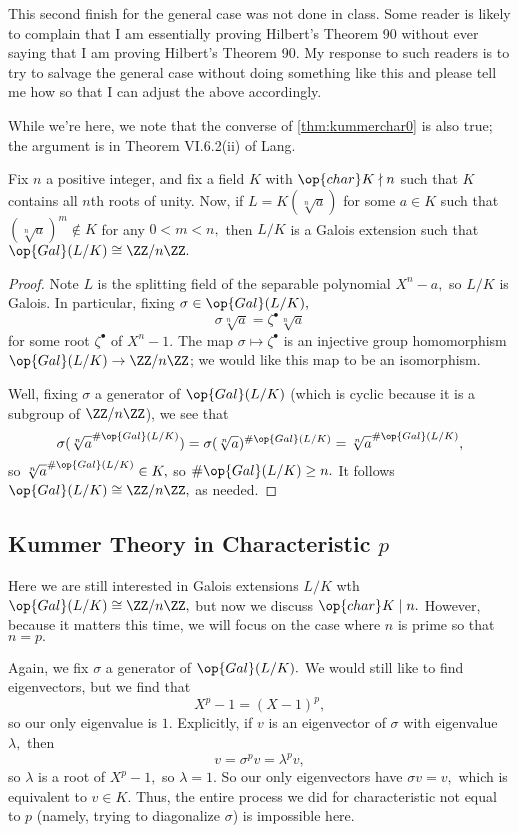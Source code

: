 \begin{remark}[Nir]
	This second finish for the general case was not done in class. Some reader is likely to complain that I am essentially proving Hilbert's Theorem 90 without ever saying that I am proving Hilbert's Theorem 90. My response to such readers is to try to salvage the general case without doing something like this and please tell me how so that I can adjust the above accordingly.
\end{remark}
While we're here, we note that the converse of \autoref{thm:kummerchar0} is also true; the argument is in Theorem VI.6.2(ii) of Lang.
\begin{proposition}
	Fix $n$ a positive integer, and fix a field $K$ with $\op{char}K\nmid n$ such that $K$ contains all $n$th roots of unity. Now, if $L=K(\sqrt[n]a)$ for some $a\in K$ such that $(\sqrt[n]a)^m\notin K$ for any $0<m<n,$ then $L/K$ is a Galois extension such that $\op{Gal}(L/K)\cong\ZZ/n\ZZ.$
\end{proposition}
\begin{proof}
	Note $L$ is the splitting field of the separable polynomial $X^n-a,$ so $L/K$ is Galois. In particular, fixing $\sigma\in\op{Gal}(L/K),$
	\[\sigma\sqrt[n]a=\zeta^\bullet\sqrt[n]a\]
	for some root $\zeta^\bullet$ of $X^n-1.$ The map $\sigma\mapsto\zeta^\bullet$ is an injective group homomorphism $\op{Gal}(L/K)\to\ZZ/n\ZZ$; we would like this map to be an isomorphism.
	
	Well, fixing $\sigma$ a generator of $\op{Gal}(L/K)$ (which is cyclic because it is a subgroup of $\ZZ/n\ZZ$), we see that
	\[\sigma(\sqrt[n]a^{\#\op{Gal}(L/K)})=\sigma(\sqrt[n]a)^{\#\op{Gal}(L/K)}=\sqrt[n]a^{\#\op{Gal}(L/K)},\]
	so $\sqrt[n]a^{\#\op{Gal}(L/K)}\in K,$ so $\#\op{Gal}(L/K)\ge n.$ It follows $\op{Gal}(L/K)\cong\ZZ/n\ZZ,$ as needed.
\end{proof}

\subsection{Kummer Theory in Characteristic \texorpdfstring{$p$}{p}}
Here we are still interested in Galois extensions $L/K$ wth $\op{Gal}(L/K)\cong\ZZ/n\ZZ,$ but now we discuss $\op{char}K\mid n.$ However, because it matters this time, we will focus on the case where $n$ is prime so that $n=p.$

Again, we fix $\sigma$ a generator of $\op{Gal}(L/K).$ We would still like to find eigenvectors, but we find that
\[X^p-1=(X-1)^p,\]
so our only eigenvalue is $1.$ Explicitly, if $v$ is an eigenvector of $\sigma$ with eigenvalue $\lambda,$ then
\[v=\sigma^pv=\lambda^pv,\]
so $\lambda$ is a root of $X^p-1,$ so $\lambda=1.$ So our only eigenvectors have $\sigma v=v,$ which is equivalent to $v\in K.$ Thus, the entire process we did for characteristic not equal to $p$ (namely, trying to diagonalize $\sigma$) is impossible here.

